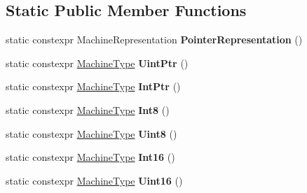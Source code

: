 \subsection*{Static Public Member Functions}
\begin{DoxyCompactItemize}
\item 
\mbox{\label{classv8_1_1internal_1_1MachineType_aef312148fda0eb026d5a2410288c52f8}} 
static constexpr Machine\+Representation {\bfseries Pointer\+Representation} ()
\item 
\mbox{\label{classv8_1_1internal_1_1MachineType_aede4cad542c2096cbfd69c1ec3db7785}} 
static constexpr \mbox{\hyperlink{classv8_1_1internal_1_1MachineType}{Machine\+Type}} {\bfseries Uint\+Ptr} ()
\item 
\mbox{\label{classv8_1_1internal_1_1MachineType_af7198a9a91985822176e0397e0669f6a}} 
static constexpr \mbox{\hyperlink{classv8_1_1internal_1_1MachineType}{Machine\+Type}} {\bfseries Int\+Ptr} ()
\item 
\mbox{\label{classv8_1_1internal_1_1MachineType_aeeb035322118bff56571cfb4474fca13}} 
static constexpr \mbox{\hyperlink{classv8_1_1internal_1_1MachineType}{Machine\+Type}} {\bfseries Int8} ()
\item 
\mbox{\label{classv8_1_1internal_1_1MachineType_a38c85fd6a1c00efad51aacbb2c1d6d8d}} 
static constexpr \mbox{\hyperlink{classv8_1_1internal_1_1MachineType}{Machine\+Type}} {\bfseries Uint8} ()
\item 
\mbox{\label{classv8_1_1internal_1_1MachineType_ab04587e0d6369e856b8d3d7b0383b1c7}} 
static constexpr \mbox{\hyperlink{classv8_1_1internal_1_1MachineType}{Machine\+Type}} {\bfseries Int16} ()
\item 
\mbox{\label{classv8_1_1internal_1_1MachineType_a9d77594eec5547debd4b0d573b2a82dd}} 
static constexpr \mbox{\hyperlink{classv8_1_1internal_1_1MachineType}{Machine\+Type}} {\bfseries Uint16} ()
\item 
\mbox{\label{classv8_1_1internal_1_1MachineType_a626bf3c4a096b2f944737bab6625c10b}} 

\end{DoxyCompactItemize}
